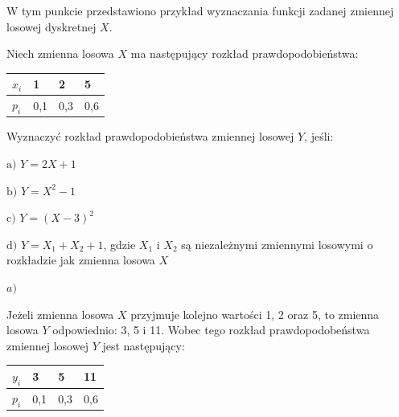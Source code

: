 \documentclass[
  letterpaper,
  DIV=11,
  numbers=noendperiod]{scrreprt}
\begin{document}
W tym punkcie przedstawiono przykład wyznaczania funkcji zadanej
zmiennej losowej dyskretnej \(X\).

\begin{tcolorbox}[enhanced jigsaw, toprule=.15mm, title=\textcolor{quarto-callout-tip-color}{\faLightbulb}\hspace{0.5em}{Przykład 8.1}, breakable, coltitle=black, titlerule=0mm, colbacktitle=quarto-callout-tip-color!10!white, opacitybacktitle=0.6, opacityback=0, bottomtitle=1mm, left=2mm, arc=.35mm, leftrule=.75mm, bottomrule=.15mm, rightrule=.15mm, toptitle=1mm, colframe=quarto-callout-tip-color-frame, colback=white]

\end{tcolorbox}

Niech zmienna losowa \(X\) ma następujący rozkład prawdopodobieństwa:

\begin{longtable}[]{@{}llll@{}}
\toprule\noalign{}
\(x_i\) & 1 & 2 & 5 \\
\midrule\noalign{}
\endhead
\bottomrule\noalign{}
\endlastfoot
\(p_i\) & 0,1 & 0,3 & 0,6 \\
\end{longtable}

Wyznaczyć rozkład prawdopodobieństwa zmiennej losowej \(Y\), jeśli:

\(\text{a) } Y = 2X+1\)

\(\text{b) } Y = X^2-1\)

\(\text{c) } Y=(X-3)^2\)

\(\text{d) } Y = X_1+X_2+1\), gdzie \(X_1\) i \(X_2\) są niezależnymi
zmiennymi losowymi o rozkładzie jak zmienna losowa \(X\)

\begin{tcolorbox}[enhanced jigsaw, toprule=.15mm, title={Rozwiązanie}, breakable, coltitle=black, titlerule=0mm, colbacktitle=quarto-callout-tip-color!10!white, opacitybacktitle=0.6, opacityback=0, bottomtitle=1mm, left=2mm, arc=.35mm, leftrule=.75mm, bottomrule=.15mm, rightrule=.15mm, toptitle=1mm, colframe=quarto-callout-tip-color-frame, colback=white]

\end{tcolorbox}

\(a)\)

Jeżeli zmienna losowa \(X\) przyjmuje kolejno wartości 1, 2 oraz 5, to
zmienna losowa \(Y\) odpowiednio: 3, 5 i 11. Wobec tego rozkład
prawdopodobeństwa zmiennej losowej \(Y\) jest następujący:

\begin{longtable}[]{@{}llll@{}}
\toprule\noalign{}
\(y_i\) & 3 & 5 & 11 \\
\midrule\noalign{}
\endhead
\bottomrule\noalign{}
\endlastfoot
\(p_i\) & 0,1 & 0,3 & 0,6 \\
\end{longtable}
\end{document}

